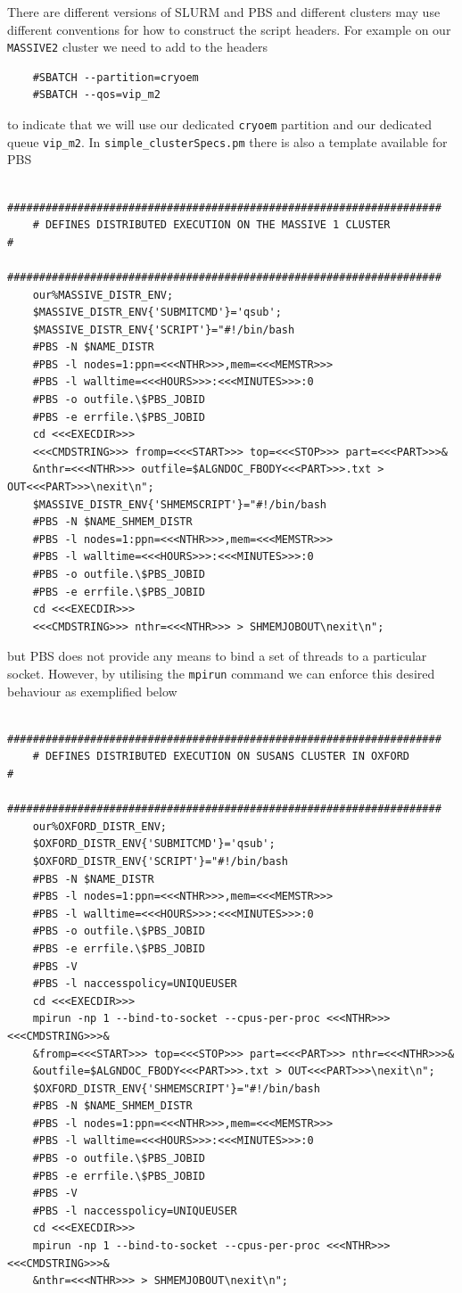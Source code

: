 \documentclass[a4paper,11pt]{article}
\begin{document}
There are different versions of SLURM and PBS and different clusters may use different conventions for how to construct the script headers. For example on our \texttt{MASSIVE2} cluster we need to add to the headers
\begin{verbatim}
    #SBATCH --partition=cryoem
    #SBATCH --qos=vip_m2
\end{verbatim}
to indicate that we will use our dedicated \texttt{cryoem} partition and our dedicated queue \texttt{vip\_m2}. In \texttt{simple\_clusterSpecs.pm} there is also a template available for PBS
\begin{verbatim}
    ####################################################################
    # DEFINES DISTRIBUTED EXECUTION ON THE MASSIVE 1 CLUSTER           #
    ####################################################################
    our%MASSIVE_DISTR_ENV;
    $MASSIVE_DISTR_ENV{'SUBMITCMD'}='qsub';
    $MASSIVE_DISTR_ENV{'SCRIPT'}="#!/bin/bash
    #PBS -N $NAME_DISTR
    #PBS -l nodes=1:ppn=<<<NTHR>>>,mem=<<<MEMSTR>>>
    #PBS -l walltime=<<<HOURS>>>:<<<MINUTES>>>:0
    #PBS -o outfile.\$PBS_JOBID
    #PBS -e errfile.\$PBS_JOBID
    cd <<<EXECDIR>>> 
    <<<CMDSTRING>>> fromp=<<<START>>> top=<<<STOP>>> part=<<<PART>>>&
    &nthr=<<<NTHR>>> outfile=$ALGNDOC_FBODY<<<PART>>>.txt > OUT<<<PART>>>\nexit\n";
    $MASSIVE_DISTR_ENV{'SHMEMSCRIPT'}="#!/bin/bash
    #PBS -N $NAME_SHMEM_DISTR
    #PBS -l nodes=1:ppn=<<<NTHR>>>,mem=<<<MEMSTR>>>
    #PBS -l walltime=<<<HOURS>>>:<<<MINUTES>>>:0
    #PBS -o outfile.\$PBS_JOBID
    #PBS -e errfile.\$PBS_JOBID
    cd <<<EXECDIR>>> 
    <<<CMDSTRING>>> nthr=<<<NTHR>>> > SHMEMJOBOUT\nexit\n";
\end{verbatim}
but PBS does not provide any means to bind a set of threads to a particular socket. However, by utilising the \texttt{mpirun} command we can enforce this desired behaviour as exemplified below
\begin{verbatim}
    ####################################################################
    # DEFINES DISTRIBUTED EXECUTION ON SUSANS CLUSTER IN OXFORD        #
    ####################################################################
    our%OXFORD_DISTR_ENV;
    $OXFORD_DISTR_ENV{'SUBMITCMD'}='qsub';
    $OXFORD_DISTR_ENV{'SCRIPT'}="#!/bin/bash
    #PBS -N $NAME_DISTR
    #PBS -l nodes=1:ppn=<<<NTHR>>>,mem=<<<MEMSTR>>>
    #PBS -l walltime=<<<HOURS>>>:<<<MINUTES>>>:0
    #PBS -o outfile.\$PBS_JOBID
    #PBS -e errfile.\$PBS_JOBID
    #PBS -V
    #PBS -l naccesspolicy=UNIQUEUSER
    cd <<<EXECDIR>>> 
    mpirun -np 1 --bind-to-socket --cpus-per-proc <<<NTHR>>> <<<CMDSTRING>>>&
    &fromp=<<<START>>> top=<<<STOP>>> part=<<<PART>>> nthr=<<<NTHR>>>&
    &outfile=$ALGNDOC_FBODY<<<PART>>>.txt > OUT<<<PART>>>\nexit\n";
    $OXFORD_DISTR_ENV{'SHMEMSCRIPT'}="#!/bin/bash
    #PBS -N $NAME_SHMEM_DISTR
    #PBS -l nodes=1:ppn=<<<NTHR>>>,mem=<<<MEMSTR>>>
    #PBS -l walltime=<<<HOURS>>>:<<<MINUTES>>>:0
    #PBS -o outfile.\$PBS_JOBID
    #PBS -e errfile.\$PBS_JOBID
    #PBS -V
    #PBS -l naccesspolicy=UNIQUEUSER
    cd <<<EXECDIR>>> 
    mpirun -np 1 --bind-to-socket --cpus-per-proc <<<NTHR>>> <<<CMDSTRING>>>&
    &nthr=<<<NTHR>>> > SHMEMJOBOUT\nexit\n";
\end{verbatim}
\end{document}
